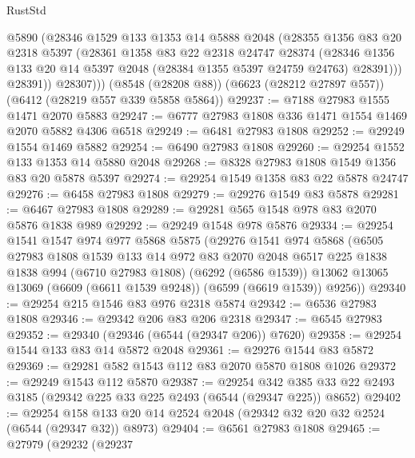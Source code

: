 \begin{lexlean}{RustStd}
\begin{coremodule}
            @5890
            (@28346
              @1529
              @133
              @1353
              @14
              @5888
              @2048
              (@28355
                @1356
                @83
                @20
                @2318
                @5397
                (@28361
                  @1358
                  @83
                  @22
                  @2318
                  @24747
                  @28374
                  (@28346
                    @1356
                    @133
                    @20
                    @14
                    @5397
                    @2048
                    (@28384 @1355 @5397 @24759 @24763)
                    @28391)))
              @28391))
          @28307)))
    (@8548 (@28208 @88))
    (@6623 (@28212 @27897 @557))
    (@6412 (@28219 @557 @339 @5858 @5864))
@29237 := @7188 @27983 @1555 @1471 @2070 @5883
@29247 := @6777 @27983 @1808 @336 @1471 @1554 @1469 @2070 @5882 @4306 @6518
@29249 := @6481 @27983 @1808
@29252 := @29249 @1554 @1469 @5882
@29254 := @6490 @27983 @1808
@29260 := @29254 @1552 @133 @1353 @14 @5880 @2048
@29268 := @8328 @27983 @1808 @1549 @1356 @83 @20 @5878 @5397
@29274 := @29254 @1549 @1358 @83 @22 @5878 @24747
@29276 := @6458 @27983 @1808
@29279 := @29276 @1549 @83 @5878
@29281 := @6467 @27983 @1808
@29289 := @29281 @565 @1548 @978 @83 @2070 @5876 @1838 @989
@29292 := @29249 @1548 @978 @5876
@29334 := @29254
    @1541
    @1547
    @974
    @977
    @5868
    @5875
    (@29276
      @1541
      @974
      @5868
      (@6505
        @27983
        @1808
        @1539
        @133
        @14
        @972
        @83
        @2070
        @2048
        @6517
        @225
        @1838
        @1838
        @994
        (@6710 @27983 @1808)
        (@6292 (@6586 @1539))
        @13062
        @13065
        @13069
        (@6609 (@6611 @1539 @9248))
        (@6599 (@6619 @1539))
        @9256))
@29340 := @29254 @215 @1546 @83 @976 @2318 @5874
@29342 := @6536 @27983 @1808
@29346 := @29342 @206 @83 @206 @2318
@29347 := @6545 @27983
@29352 := @29340 (@29346 (@6544 (@29347 @206)) @7620)
@29358 := @29254 @1544 @133 @83 @14 @5872 @2048
@29361 := @29276 @1544 @83 @5872
@29369 := @29281 @582 @1543 @112 @83 @2070 @5870 @1808 @1026
@29372 := @29249 @1543 @112 @5870
@29387 := @29254
    @342
    @385
    @33
    @22
    @2493
    @3185
    (@29342 @225 @33 @225 @2493 (@6544 (@29347 @225)) @8652)
@29402 := @29254 @158 @133 @20 @14 @2524 @2048 (@29342 @32 @20 @32 @2524 (@6544 (@29347 @32)) @8973)
@29404 := @6561 @27983 @1808
@29465 := @27979
    (@29232
      (@29237

\end{coremodule}
\end{lexlean}
